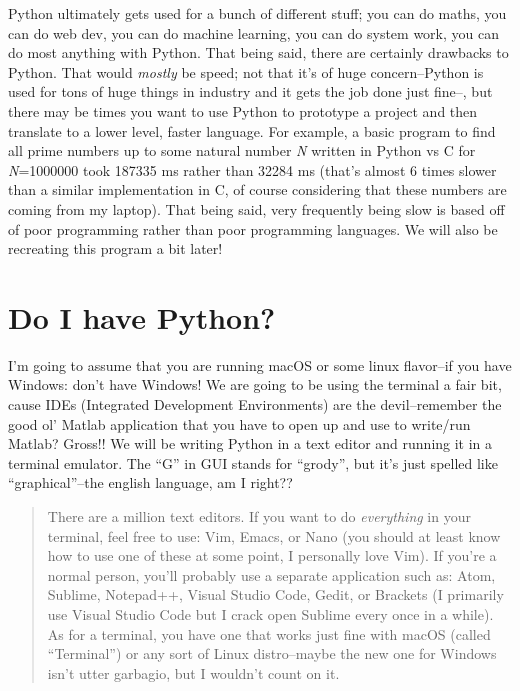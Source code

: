 \documentclass[11pt, twoside, reqno]{book}
\begin{document}
Python ultimately gets used for a bunch of different stuff; you can do maths, you can do web dev, you can do machine learning, you can do system work, you can do most anything with Python. That being said, there are certainly drawbacks to Python. That would \textit{mostly} be speed; not that it's of huge concern--Python is used for tons of huge things in industry and it gets the job done just fine--, but there may be times you want to use Python to prototype a project and then translate to a lower level, faster language. For example, a basic program to find all prime numbers up to some natural number \textit{N} written in Python vs C for \textit{N}=1000000 took 187335 ms rather than 32284 ms (that's almost 6 times slower than a similar implementation in C, of course considering that these numbers are coming from my laptop). That being said, very frequently being slow is based off of poor programming rather than poor programming languages. We will also be recreating this program a bit later!

\section{Do I have Python?}

I'm going to assume that you are running macOS or some linux flavor--if you have Windows: don't have Windows! We are going to be using the terminal a fair bit, cause IDEs (Integrated Development Environments) are the devil--remember the good ol' Matlab application that you have to open up and use to write/run Matlab? Gross!! We will be writing Python in a text editor and running it in a terminal emulator. The ``G'' in GUI stands for ``grody'', but it's just spelled like ``graphical''--the english language, am I right??

\label{A quick aside for setting up your environment:}

\begin{quote}
There are a million text editors. If you want to do \textit{everything} in your terminal, feel free to use: Vim, Emacs, or Nano (you should at least know how to use one of these at some point, I personally love Vim). If you're a normal person, you'll probably use a separate application such as: Atom, Sublime, Notepad++, Visual Studio Code, Gedit, or Brackets (I primarily use Visual Studio Code but I crack open Sublime every once in a while). As for a terminal, you have one that works just fine with macOS (called ``Terminal'') or any sort of Linux distro--maybe the new one for Windows isn't utter garbagio, but I wouldn't count on it.
\end{quote}
\end{document}
